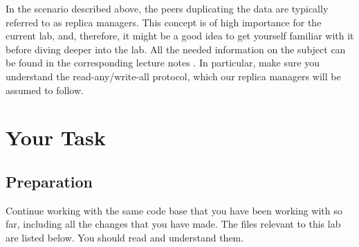 \documentclass[a4paper]{article}
\begin{document}
In the scenario described above, the peers duplicating the data are typically
referred to as replica managers. This concept is of high importance for the
current lab, and, therefore, it might be a good idea to get yourself familiar
with it before diving deeper into the lab. All the needed information on the
subject can be found in the corresponding lecture notes \cite{lecture8}. In
particular, make sure you understand the read-any/write-all protocol, which our
replica managers will be assumed to follow.

\section{Your Task}
\subsection{Preparation} 
Continue working with the same code base that you have been working with so far,
including all the changes that you have made. The files relevant to this lab are
listed below. You should read and understand them.
\end{document}

